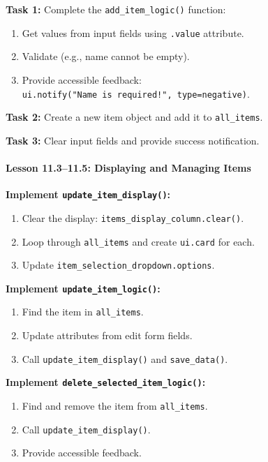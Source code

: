 \documentclass[
  justified,
  openright,
]{tufte-book}
\let\subsubsection\paragraph
\let\paragraph\paragraph
\let\subsubsection\paragraph
\let\paragraph\paragraph
\providecommand{\tightlist}{%
  \setlength{\itemsep}{0pt}\setlength{\parskip}{0pt}}
\begin{document}
\textbf{Task 1:} Complete the \texttt{add\_item\_logic()} function:

\begin{enumerate}
\def\labelenumi{\arabic{enumi}.}
\tightlist
\item
  Get values from input fields using \texttt{.value} attribute.
\item
  Validate (e.g., name cannot be empty).
\item
  Provide accessible feedback:
  \texttt{ui.notify("Name\ is\ required!",\ type=\textquotesingle{}negative\textquotesingle{})}.
\end{enumerate}

\textbf{Task 2:} Create a new item object and add it to
\texttt{all\_items}.

\textbf{Task 3:} Clear input fields and provide success notification.

\subsubsection{Lesson 11.3--11.5: Displaying and Managing
Items}\label{lesson-11.311.5-displaying-and-managing-items}

\textbf{Implement \texttt{update\_item\_display()}:}

\begin{enumerate}
\def\labelenumi{\arabic{enumi}.}
\tightlist
\item
  Clear the display: \texttt{items\_display\_column.clear()}.
\item
  Loop through \texttt{all\_items} and create \texttt{ui.card} for each.
\item
  Update \texttt{item\_selection\_dropdown.options}.
\end{enumerate}

\textbf{Implement \texttt{update\_item\_logic()}:}

\begin{enumerate}
\def\labelenumi{\arabic{enumi}.}
\tightlist
\item
  Find the item in \texttt{all\_items}.
\item
  Update attributes from edit form fields.
\item
  Call \texttt{update\_item\_display()} and \texttt{save\_data()}.
\end{enumerate}

\textbf{Implement \texttt{delete\_selected\_item\_logic()}:}

\begin{enumerate}
\def\labelenumi{\arabic{enumi}.}
\tightlist
\item
  Find and remove the item from \texttt{all\_items}.
\item
  Call \texttt{update\_item\_display()}.
\item
  Provide accessible feedback.
\end{enumerate}
\end{document}
